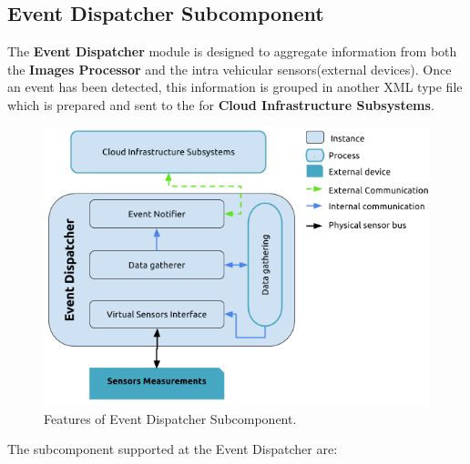 \subsection{Event Dispatcher Subcomponent}

The \textbf{Event Dispatcher} module is designed to aggregate information from both the \textbf{Images Processor} and the intra vehicular sensors(external devices). Once an event has been detected, this information is grouped in another XML type file which is prepared and sent to the for \textbf{Cloud Infrastructure Subsystems}. 
% 
% 
%
%

\begin{figure}[htb!]
 	\centering
 	\includegraphics[scale=0.70]{Imagens/cap4_evtdspt.png}
 	\caption{Features of Event Dispatcher Subcomponent.}    
 	\label{fig:evtdspt}
\end{figure}

The subcomponent supported at the Event Dispatcher are:

